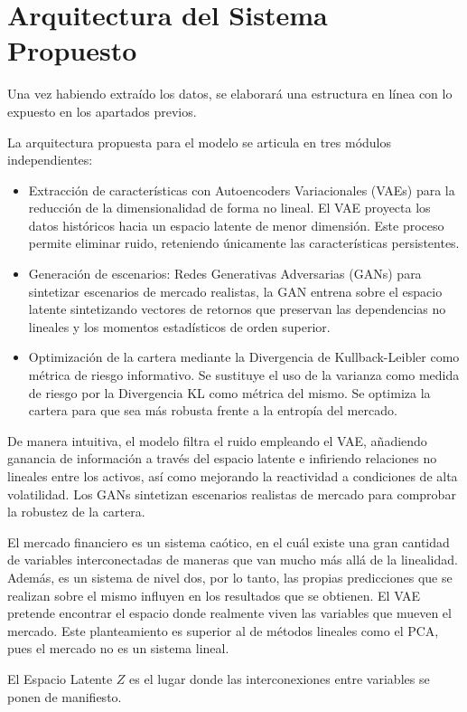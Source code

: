 \section{Arquitectura del Sistema Propuesto}

Una vez habiendo extraído los datos, se elaborará una estructura en línea con lo expuesto en los apartados previos.

La arquitectura propuesta para el modelo se articula en tres módulos independientes:
\begin{itemize}
    \item Extracción de características con Autoencoders Variacionales (VAEs) para la reducción de la dimensionalidad de forma no lineal. El VAE proyecta los datos históricos hacia un espacio latente de menor dimensión. Este proceso permite eliminar ruido, reteniendo únicamente las características persistentes.
    \item Generación de escenarios: Redes Generativas Adversarias (GANs) para sintetizar escenarios de mercado realistas, la GAN entrena sobre el espacio latente sintetizando vectores de retornos que preservan las dependencias no lineales y los momentos estadísticos de orden superior.
    \item Optimización de la cartera mediante la Divergencia de Kullback-Leibler como métrica de riesgo informativo. Se sustituye el uso de la varianza como medida de riesgo por la Divergencia KL como métrica del mismo. Se optimiza la cartera para que sea más robusta frente a la entropía del mercado.
\end{itemize}
De manera intuitiva, el modelo filtra el ruido empleando el VAE, añadiendo ganancia de información a través del espacio latente e infiriendo relaciones no lineales entre los activos, así como mejorando la reactividad a condiciones de alta volatilidad. Los GANs sintetizan escenarios realistas de mercado para comprobar la robustez de la cartera.

El mercado financiero es un sistema caótico, en el cuál existe una gran cantidad de variables interconectadas de maneras que van mucho más allá de la linealidad. Además, es un sistema de nivel dos, por lo tanto, las propias predicciones que se realizan sobre el mismo influyen en los resultados que se obtienen. El VAE pretende encontrar el espacio donde realmente viven las variables que mueven el mercado. Este planteamiento es superior al de métodos lineales como el PCA, pues el mercado no es un sistema lineal. 

El Espacio Latente $Z$ es el lugar donde las interconexiones entre variables se ponen de manifiesto.

